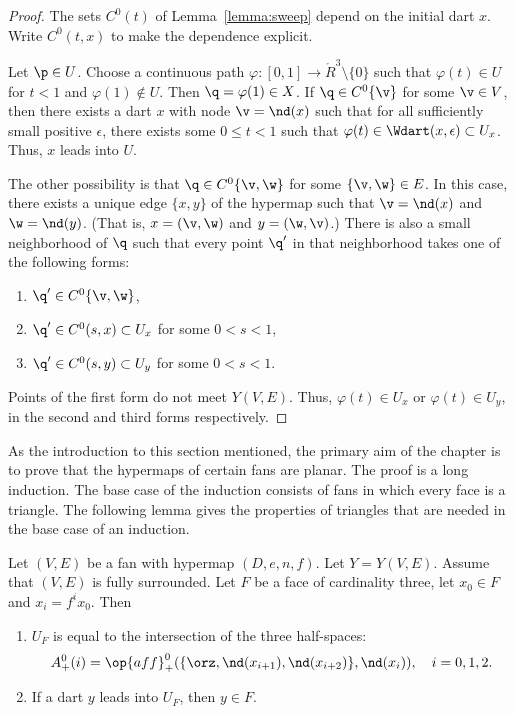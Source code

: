 \begin{proof}  
The sets $C^0(t)$ of Lemma~\ref{lemma:sweep} depend on the initial dart $x$.
Write $C^0(t,x)$ to make the dependence explicit.

Let $\p\in U$.  Choose a continuous path $\varphi:[0,1]\to
\ring{R}^3\setminus\{0\}$ such that $\varphi(t)\in U$ for $t<1$ and
$\varphi(1)\not\in U$.  Then $\q=\varphi(1)\in X$.  If $\q\in
C^0\{\v\}$ for some $\v\in V$, then there exists a dart $x$ with
node $\v = \nd(x)$ such that for all sufficiently small positive
$\epsilon$, there exists some $0\le t < 1$ such that $\varphi(t)\in
\Wdart(x,\epsilon)\subset U_x$.  Thus, $x$ leads into $U$.
%

The other possibility is that $\q\in C^0\{\v,\w\}$ for some
$\{\v,\w\}\in E$.  In this case, there exists a unique edge $\{x,y\}$ of
the hypermap such that $\v=\nd(x)$ and $\w=\nd(y)$.  (That is,
$x=(\v,\w)$ and $y=(\w,\v)$.)  There is also a small neighborhood of
$\q$ such that every point $\q'$ in that neighborhood takes one of
the following forms:
\begin{enumerate}\wasitemize  \item $\q'\in C^0\{\v,\w\}$,
\item $\q'\in C^0(s,x)\subset U_x$ for some $0<s<1$,
\item $\q'\in C^0(s,y)\subset U_y$ for some $0<s<1$.
\end{enumerate}\wasitemize 
Points of the first form do not meet $Y(V,E)$.  Thus, $\varphi(t)\in U_x$
or $\varphi(t)\in U_y$, in the second and third forms respectively.
\end{proof}

As the introduction to this section mentioned, the primary aim of the chapter
is to prove that the hypermaps of certain fans are planar.  The proof is a long
induction.  The base case of the induction consists of fans in which every face
is a triangle.  The following lemma gives the properties of triangles that are
needed in the base case of an induction.

\begin{lemma} \label{lemma:triangle}
Let $(V,E)$ be a fan with hypermap $(D,e,n,f)$.  Let $Y=Y(V,E)$.
Assume that $(V,E)$ is fully surrounded. Let  $F$ be a face of
cardinality three, let $x_0\in F$ and  $x_i = f^i x_0$. Then
%
\begin{enumerate}\wasitemize   
\item $U_F$ is equal to the intersection of the three half-spaces:
\[ A^0_+(i)=\op{aff}_+^0(\{\orz,\nd(x_{i+1}),\nd(x_{i+2})\},\nd(x_i)),\quad
i=0,1,2.\] 
\item If a dart $y$ leads into $U_F$, then $y\in F$.
\end{enumerate}\wasitemize 
\end{lemma}
%

